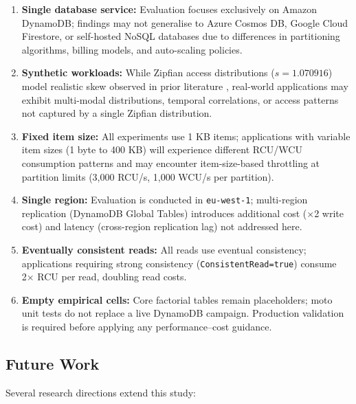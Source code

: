 \begin{enumerate}
    \item \textbf{Single database service:} Evaluation focuses exclusively on Amazon DynamoDB; findings may not generalise to Azure Cosmos DB, Google Cloud Firestore, or self-hosted NoSQL databases due to differences in partitioning algorithms, billing models, and auto-scaling policies.
    
    \item \textbf{Synthetic workloads:} While Zipfian access distributions ($s = 1.070916$) model realistic skew observed in prior literature \citep{kanellis2025f2, ziegler2023oltp}, real-world applications may exhibit multi-modal distributions, temporal correlations, or access patterns not captured by a single Zipfian distribution.
    
    \item \textbf{Fixed item size:} All experiments use 1 KB items; applications with variable item sizes (1 byte to 400 KB) will experience different RCU/WCU consumption patterns and may encounter item-size-based throttling at partition limits (3,000 RCU/s, 1,000 WCU/s per partition).
    
    \item \textbf{Single region:} Evaluation is conducted in \texttt{eu-west-1}; multi-region replication (DynamoDB Global Tables) introduces additional cost ($\times$2 write cost) and latency (cross-region replication lag) not addressed here.
    
    \item \textbf{Eventually consistent reads:} All reads use eventual consistency; applications requiring strong consistency (\texttt{ConsistentRead=true}) consume 2× RCU per read, doubling read costs.
    
    \item \textbf{Empty empirical cells:} Core factorial tables remain placeholders; moto unit tests do not replace a live DynamoDB campaign. Production validation is required before applying any performance--cost guidance.
\end{enumerate}

\subsection{Future Work}

Several research directions extend this study:

